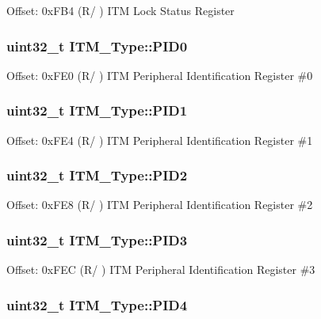 Offset\-: 0x\-F\-B4 (R/ ) I\-T\-M Lock Status Register \hypertarget{structITM__Type_ab69ade751350a7758affdfe396517535}{
\subsubsection[{P\-I\-D0}]{ uint32\-\_\-t I\-T\-M\-\_\-\-Type\-::\-P\-I\-D0}}\label{structITM__Type_ab69ade751350a7758affdfe396517535}
Offset\-: 0x\-F\-E0 (R/ ) I\-T\-M Peripheral Identification Register \#0 \hypertarget{structITM__Type_a30e87ec6f93ecc9fe4f135ca8b068990}{
\subsubsection[{P\-I\-D1}]{ uint32\-\_\-t I\-T\-M\-\_\-\-Type\-::\-P\-I\-D1}}\label{structITM__Type_a30e87ec6f93ecc9fe4f135ca8b068990}
Offset\-: 0x\-F\-E4 (R/ ) I\-T\-M Peripheral Identification Register \#1 \hypertarget{structITM__Type_ae139d2e588bb382573ffcce3625a88cd}{
\subsubsection[{P\-I\-D2}]{ uint32\-\_\-t I\-T\-M\-\_\-\-Type\-::\-P\-I\-D2}}\label{structITM__Type_ae139d2e588bb382573ffcce3625a88cd}
Offset\-: 0x\-F\-E8 (R/ ) I\-T\-M Peripheral Identification Register \#2 \hypertarget{structITM__Type_af006ee26c7e61c9a3712a80ac74a6cf3}{
\subsubsection[{P\-I\-D3}]{ uint32\-\_\-t I\-T\-M\-\_\-\-Type\-::\-P\-I\-D3}}\label{structITM__Type_af006ee26c7e61c9a3712a80ac74a6cf3}
Offset\-: 0x\-F\-E\-C (R/ ) I\-T\-M Peripheral Identification Register \#3 \hypertarget{structITM__Type_accfc7de00b0eaba0301e8f4553f70512}{
\subsubsection[{P\-I\-D4}]{ uint32\-\_\-t I\-T\-M\-\_\-\-Type\-::\-P\-I\-D4}}\label{structITM__Type_accfc7de00b0eaba0301e8f4553f70512}
